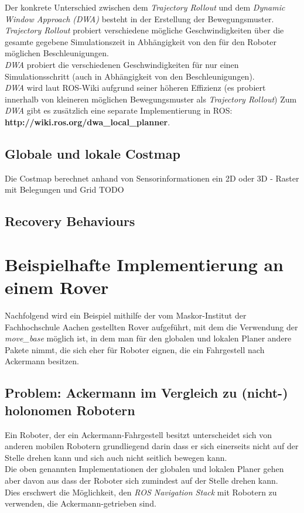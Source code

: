 \documentclass[oribibl]{llncs}
\begin{document}
Der konkrete Unterschied zwischen dem \textit{Trajectory Rollout} und dem \textit{Dynamic Window Approach (DWA)} besteht in der Erstellung der Bewegungsmuster.\\
\textit{Trajectory Rollout} probiert verschiedene mögliche Geschwindigkeiten über die gesamte gegebene Simulationszeit in Abhängigkeit von den für den Roboter möglichen Beschleunigungen.\\
\textit{DWA} probiert die verschiedenen Geschwindigkeiten für nur einen Simulationsschritt (auch in Abhängigkeit von den Beschleunigungen).\\
\textit{DWA} wird laut ROS-Wiki aufgrund seiner höheren Effizienz (es probiert innerhalb von kleineren möglichen Bewegungsmuster als \textit{Trajectory Rollout}) \cite{baseLocalPlanner}
Zum \textit{DWA} gibt es zusätzlich eine separate Implementierung in ROS:\\ \textbf{http://wiki.ros.org/dwa\_local\_planner}.
\subsection{Globale und lokale Costmap}
Die Costmap berechnet anhand von Sensorinformationen ein 2D oder 3D - Raster mit Belegungen und Grid TODO \cite{costmap2d}
\subsection{Recovery Behaviours}
\section{Beispielhafte Implementierung an einem Rover}
Nachfolgend wird ein Beispiel mithilfe der vom Maskor-Institut der Fachhochschule Aachen gestellten Rover aufgeführt, mit dem die Verwendung der \textit{move\_base} möglich ist, in dem man für den globalen und lokalen Planer andere Pakete nimmt, die sich eher für Roboter eignen, die ein Fahrgestell nach Ackermann besitzen.\\
\subsection{Problem: Ackermann im Vergleich zu (nicht-) holonomen Robotern}
Ein Roboter, der ein Ackermann-Fahrgestell besitzt unterscheidet sich von anderen mobilen Robotern grundliegend darin dass er sich einerseits nicht auf der Stelle drehen kann und sich auch nicht seitlich bewegen kann.\\
Die oben genannten Implementationen der globalen und lokalen Planer gehen aber davon aus dass der Roboter sich zumindest auf der Stelle drehen kann.\\
Dies erschwert die Möglichkeit, den \textit{ROS Navigation Stack} mit Robotern zu verwenden, die Ackermann-getrieben sind.\cite{ackermannGroup}
\end{document}
